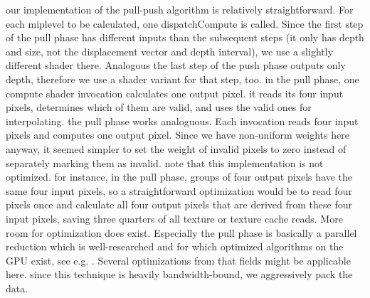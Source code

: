 \begin{outline}
\1 our implementation of the pull-push algorithm is relatively straightforward. For each miplevel to be calculated, one dispatchCompute is called. Since the first step of the pull phase has different inputs than the subsequent steps (it only has depth and size, not the displacement vector and depth interval), we use a slightly different shader there. Analogous the last step of the push phase outputs only depth, therefore we use a shader variant for that step, too.
\1 in the pull phase, one compute shader invocation calculates one output pixel. it reads its four input pixels, determines which of them are valid, and uses the valid ones for interpolating.
\1 the pull phase works analoguous. Each invocation reads four input pixels and computes one output pixel. Since we have non-uniform weights here anyway, it seemed simpler to set the weight of invalid pixels to zero instead of separately marking them as invalid.
\1 note that this implementation is not optimized. for instance, in the pull phase, groups of four output pixels have the same four input pixels, so a straightforward optimization would be to read four pixels once and calculate all four output pixels that are derived from these four input pixels, saving three quarters of all texture or texture cache reads.
\1 More room for optimization does exist. Especially the pull phase is basically a parallel reduction which is well-researched and for which optimized algorithms on the GPU exist, see e.g. \citet{thatNVIDIAPresentation}. Several optimizations from that fields might be applicable here.
\1 since this technique is heavily bandwidth-bound, we aggressively pack the data.
\end{outline}



